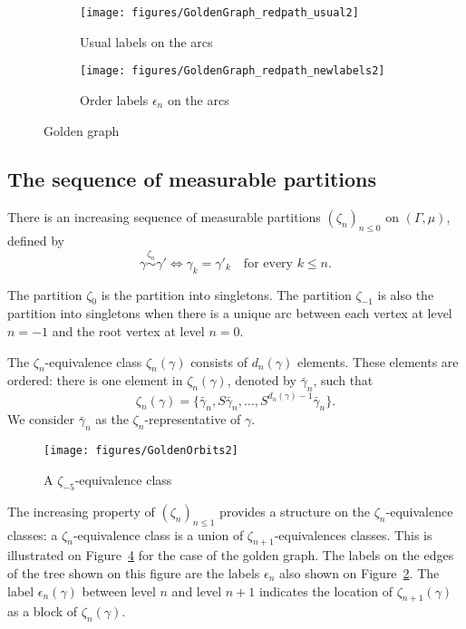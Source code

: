 \documentclass[12pt,a4paper]{article}
\begin{document}
\begin{figure}[!h]
   \centering
   \begin{subfigure}[t]{0.37\textwidth}
   \centering
   	\texttt{[image: figures/GoldenGraph\_redpath\_usual2]}
 		\caption{\footnotesize Usual labels on the arcs}\label{fig:GoldenGraph}
    \end{subfigure}              
   \quad
    \begin{subfigure}[t]{0.37\textwidth}
    \centering
   	\texttt{[image: figures/GoldenGraph\_redpath\_newlabels2]}
 		\caption{\footnotesize Order labels $\epsilon_n$ on the arcs}\label{fig:GoldenGraph_newlabs}
 	\end{subfigure}      
   \caption{Golden graph}
   \label{fig:goldengraph}
 \end{figure}


\subsection{The sequence of measurable partitions}

There is an increasing sequence of measurable partitions ${(\zeta_n)}_{n \leq 0}$ 
on $(\Gamma, \mu)$, defined by 
$$
\boxed{\gamma \overset{\zeta_n}{\sim} \gamma' 
\iff \gamma_k=\gamma'_k \quad\text{for every $k \leq n$}}.
$$ 

The partition $\zeta_0$ is the partition into singletons. 
The partition $\zeta_{-1}$ is also the partition into singletons 
when there is a unique arc between each vertex at level $n=-1$ and the root vertex 
at level $n=0$.  

The $\zeta_n$-equivalence class $\zeta_n(\gamma)$ consists of $d_n(\gamma)$ elements. 
These elements are ordered: there is one element in $\zeta_n(\gamma)$, denoted by 
$\bar\gamma_n$, such that 
$$
\boxed{\zeta_n(\gamma)= \{\bar\gamma_n, S\bar\gamma_n, \ldots, S^{d_n(\gamma)-1}\bar\gamma_n\}}.
$$
We consider $\bar\gamma_n$ as the $\zeta_n$-representative of $\gamma$.

\begin{figure}[!h]
\centering
	\texttt{[image: figures/GoldenOrbits2]}
\caption{A $\zeta_{-5}$-equivalence class}
\label{fig:GoldenOrbits}
\end{figure}


The increasing property of ${(\zeta_n)}_{n \leq 1}$ provides a structure 
on the $\zeta_{n}$-equivalence classes: a $\zeta_n$-equivalence class 
is a union of $\zeta_{n+1}$-equivalences classes. 
This is illustrated on Figure~\ref{fig:GoldenOrbits} for the case of the golden graph. 
The labels on the edges of the tree shown on this figure are the labels $\epsilon_n$ 
also shown on Figure~\ref{fig:GoldenGraph_newlabs}. 
The label $\epsilon_n(\gamma)$ between level $n$ and level $n+1$ indicates the location of 
$\zeta_{n+1}(\gamma)$ as a block of $\zeta_n(\gamma)$. 
\end{document}
